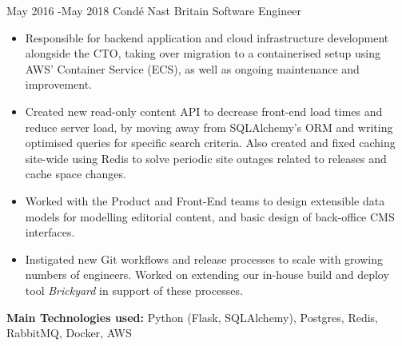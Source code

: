 \documentclass[10pt]{article} %
\begin{document}
\jobheader
{May 2016 -}{May 2018}
{Condé Nast Britain}
{Software Engineer}
\vspace{-1cm}
  \begin{itemize}

  \item Responsible for backend application and cloud infrastructure development
        alongside the CTO, taking over migration to a containerised setup using AWS' Container Service (ECS), as well as ongoing maintenance and improvement.

  \item Created new read-only content API to decrease front-end load times and
        reduce server load, by moving away from SQLAlchemy's ORM and writing
        optimised queries for specific search criteria. Also created and fixed
        caching site-wide using Redis to solve periodic site outages related to
        releases and cache space changes.

  \item Worked with the Product and Front-End teams to design extensible data models
        for modelling editorial content, and basic design of back-office CMS
        interfaces.

  \item Instigated new Git workflows and release processes to scale with growing
        numbers of engineers. Worked on extending our in-house build and deploy
        tool \textit{Brickyard} in support of these processes.

  \end{itemize}

  \textbf{Main Technologies used:}
  Python (Flask, SQLAlchemy),
  Postgres, Redis, RabbitMQ, Docker, AWS


\clearpage
\end{document}
